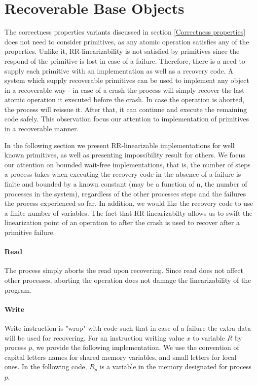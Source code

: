 
\section{Recoverable Base Objects}
\label{section: Recoverable Base Objects}

The correctness properties variants discussed in section \ref{Correctness properties} does not need to consider primitives, as any atomic operation satisfies any of the properties. Unlike it, RR-linearizability is not satisfied by primitives since the respond of the primitive is lost in case of a failure. Therefore, there is a need to supply each primitive with an implementation as well as a recovery code. A system which supply recoverable primitives can be used to implement any object in a recoverable way - in case of a crash the process will simply recover the last atomic operation it executed before the crash. In case the operation is aborted, the process will reissue it. After that, it can continue and execute the remaining code safely. This observation focus our attention to implementation of primitives in a recoverable manner.

In the following section we present RR-linearizable implementations for well known primitives, as well as presenting impossibility result for others. We focus our attention on bounded wait-free implementations, that is, the number of steps a process takes when executing the recovery code in the absence of a failure is finite and bounded by a known constant (may be a function of n, the number of processes in the system), regardless of the other processes steps and the failures the process experienced so far. In addition, we would like the recovery code to use a finite number of variables.
The fact that RR-linearizabilty allows us to swift the linearization point of an operation to after the crash is used to recover after a primitive failure.

\paragraph*{Read}

The process simply aborts the read upon recovering. Since read does not affect other processes, aborting the operation does not damage the linearizability of the program.

\paragraph*{Write}
Write instruction is "wrap" with code such that in case of a failure the extra data will be used for recovering. For an instruction writing value $x$ to variable $R$ by process $p$, we provide the following implementation. We use the convention of capital letters names for shared memory variables, and small letters for local ones. In the following code, $R_p$ is a variable in the memory designated for process $p$.


